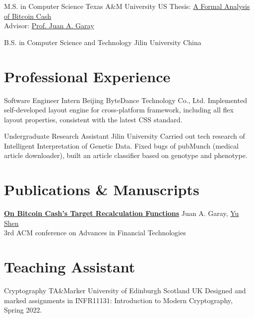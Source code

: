 \documentclass[11pt, a4paper, sans]{moderncv} %
\begin{document}
{M.S. in Computer Science}
{Texas A\&M University}
{}
{US}
{Thesis: \href{https://oaktrust.library.tamu.edu/bitstream/handle/1969.1/195819/SHEN-THESIS-2021.pdf}{A Formal Analysis of Bitcoin Cash} \\Advisor: \href{https://jagaray.com/}{Prof. Juan A. Garay}}

{B.S. in Computer Science and Technology}
{Jilin University}
{}
{China}
{}


\section{Professional Experience}

{Software Engineer Intern}
{Beijing ByteDance Technology Co., Ltd.}
{}
{}
{Implemented self-developed layout engine for cross-platform framework, including all flex layout properties, consistent with the latest CSS standard.}

{Undergraduate Research Assistant}
{Jilin University}
{}
{}
{Carried out tech research of Intelligent Interpretation of Genetic Data. Fixed bugs of pubMunch (medical article downloader), built an article classifier based on genotype and phenotype.}


\section{Publications \& Manuscripts}

{\textbf{\href{https://eprint.iacr.org/2021/143.pdf}{On Bitcoin Cash's Target Recalculation Functions}}}
{}
{}
{}
{\normalsize Juan A. Garay, \underline{Yu Shen} \\ 3rd ACM conference on Advances in Financial Technologies}


\section{Teaching Assistant}

{Cryptography TA\&Marker}
{University of Edinburgh}
{Scotland}
{UK}
{Designed and marked assignments in INFR11131: Introduction to Modern Cryptography, Spring 2022.}
\end{document}
